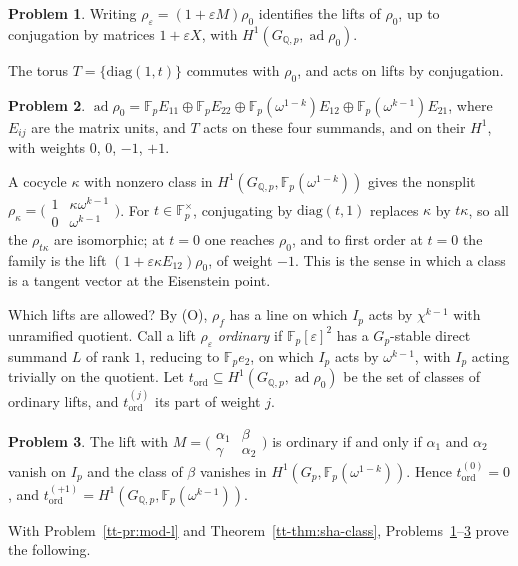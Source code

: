 \documentclass[reqno]{amsart}
\theoremstyle{definition}
\newtheorem{problem}{Problem}[section]
\theoremstyle{plain}
\newcommand{\Q}{\mathbb{Q}}
\newcommand{\F}{\mathbb{F}}
\newcommand{\ad}{\operatorname{ad}}
\newcommand{\GQ}{G_{\Q,p}}
\newcommand{\mat}[4]{\bigl(\begin{smallmatrix} #1 & #2 \\ #3 & #4 \end{smallmatrix}\bigr)}
\begin{document}
\begin{problem}\label{pr:tangent}
Writing \(\rho_\varepsilon = (1 + \varepsilon M)\rho_0\) identifies the lifts of \(\rho_0\), up to conjugation by matrices \(1 + \varepsilon X\), with \(H^1(\GQ, \ad\rho_0)\).
\end{problem}

The torus \(T = \{\mathrm{diag}(1, t)\}\) commutes with \(\rho_0\), and acts on lifts by conjugation.

\begin{problem}\label{pr:weights}
\(\ad\rho_0 = \F_p E_{11} \oplus \F_p E_{22} \oplus \F_p(\omega^{1-k}) E_{12} \oplus \F_p(\omega^{k-1}) E_{21}\), where \(E_{ij}\) are the matrix units, and \(T\) acts on these four summands, and on their \(H^1\), with weights \(0\), \(0\), \(-1\), \(+1\).
\end{problem}

A cocycle \(\kappa\) with nonzero class in \(H^1(\GQ, \F_p(\omega^{1-k}))\) gives the nonsplit \(\rho_\kappa = \mat{1}{\kappa\omega^{k-1}}{0}{\omega^{k-1}}\).  For \(t \in \F_p^\times\), conjugating by \(\mathrm{diag}(t,1)\) replaces \(\kappa\) by \(t\kappa\), so all the \(\rho_{t\kappa}\) are isomorphic; at \(t = 0\) one reaches \(\rho_0\), and to first order at \(t = 0\) the family is the lift \((1 + \varepsilon\kappa E_{12})\rho_0\), of weight \(-1\).  This is the sense in which a class is a tangent vector at the Eisenstein point.

Which lifts are allowed?  By (O), \(\rho_f\) has a line on which \(I_p\) acts by \(\chi^{k-1}\) with unramified quotient.  Call a lift \(\rho_\varepsilon\) \emph{ordinary} if \(\F_p[\varepsilon]^2\) has a \(G_p\)-stable direct summand \(L\) of rank \(1\), reducing to \(\F_p e_2\), on which \(I_p\) acts by \(\omega^{k-1}\), with \(I_p\) acting trivially on the quotient.  Let \(t_{\mathrm{ord}} \subseteq H^1(\GQ, \ad\rho_0)\) be the set of classes of ordinary lifts, and \(t_{\mathrm{ord}}^{(j)}\) its part of weight \(j\).

\begin{problem}\label{pr:ordinary}
The lift with \(M = \mat{\alpha_1}{\beta}{\gamma}{\alpha_2}\) is ordinary if and only if \(\alpha_1\) and \(\alpha_2\) vanish on \(I_p\) and the class of \(\beta\) vanishes in \(H^1(G_p, \F_p(\omega^{1-k}))\).  Hence \(t_{\mathrm{ord}}^{(0)} = 0\), and \(t_{\mathrm{ord}}^{(+1)} = H^1(\GQ, \F_p(\omega^{k-1}))\).
\end{problem}

With Problem~\ref{tt-pr:mod-l} and Theorem~\ref{tt-thm:sha-class}, Problems~\ref{pr:tangent}--\ref{pr:ordinary} prove the following.
\end{document}
